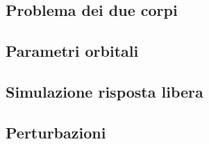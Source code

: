
\subsection{Problema dei due corpi}

\subsection{Parametri orbitali} 

\subsection{Simulazione risposta libera}

\subsection{Perturbazioni}

